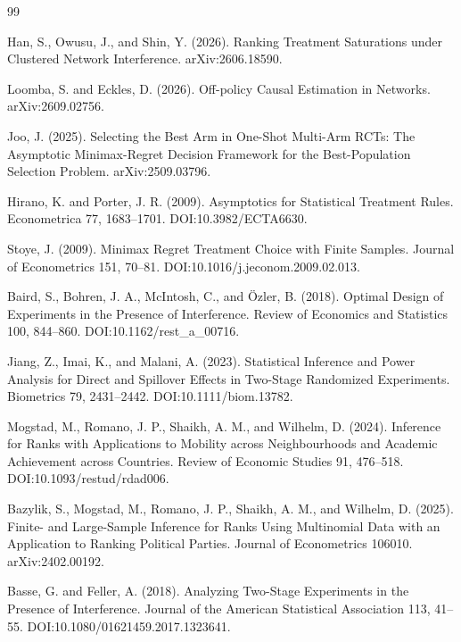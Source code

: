\documentclass{article}
\begin{document}
\begin{thebibliography}{99}

   Han, S., Owusu, J., and Shin, Y. (2026). Ranking Treatment Saturations under Clustered Network Interference. arXiv:2606.18590.

   Loomba, S. and Eckles, D. (2026). Off-policy Causal Estimation in Networks. arXiv:2609.02756.

   Joo, J. (2025). Selecting the Best Arm in One-Shot Multi-Arm RCTs: The Asymptotic Minimax-Regret Decision Framework for the Best-Population Selection Problem. arXiv:2509.03796.

   Hirano, K. and Porter, J. R. (2009). Asymptotics for Statistical Treatment Rules. Econometrica 77, 1683--1701. DOI:10.3982/ECTA6630.

   Stoye, J. (2009). Minimax Regret Treatment Choice with Finite Samples. Journal of Econometrics 151, 70--81. DOI:10.1016/j.jeconom.2009.02.013.

   Baird, S., Bohren, J. A., McIntosh, C., and Özler, B. (2018). Optimal Design of Experiments in the Presence of Interference. Review of Economics and Statistics 100, 844--860. DOI:10.1162/rest\_a\_00716.

   Jiang, Z., Imai, K., and Malani, A. (2023). Statistical Inference and Power Analysis for Direct and Spillover Effects in Two-Stage Randomized Experiments. Biometrics 79, 2431--2442. DOI:10.1111/biom.13782.

   Mogstad, M., Romano, J. P., Shaikh, A. M., and Wilhelm, D. (2024). Inference for Ranks with Applications to Mobility across Neighbourhoods and Academic Achievement across Countries. Review of Economic Studies 91, 476--518. DOI:10.1093/restud/rdad006.

   Bazylik, S., Mogstad, M., Romano, J. P., Shaikh, A. M., and Wilhelm, D. (2025). Finite- and Large-Sample Inference for Ranks Using Multinomial Data with an Application to Ranking Political Parties. Journal of Econometrics 106010. arXiv:2402.00192.

   Basse, G. and Feller, A. (2018). Analyzing Two-Stage Experiments in the Presence of Interference. Journal of the American Statistical Association 113, 41--55. DOI:10.1080/01621459.2017.1323641.


\end{thebibliography}
\end{document}
